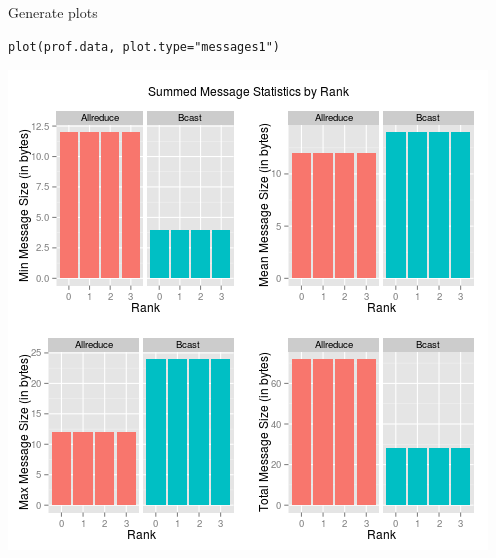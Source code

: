 \begin{frame}[fragile]
  \begin{block}{Generate plots}
  \begin{center}\vspace{-.6cm}
\begin{lstlisting}
plot(prof.data, plot.type="messages1")
\end{lstlisting}\vspace{-.2cm}
\includegraphics[scale=.39]{../common/pics/prof/messages1.png}
\end{center}
  \end{block}
\end{frame}




